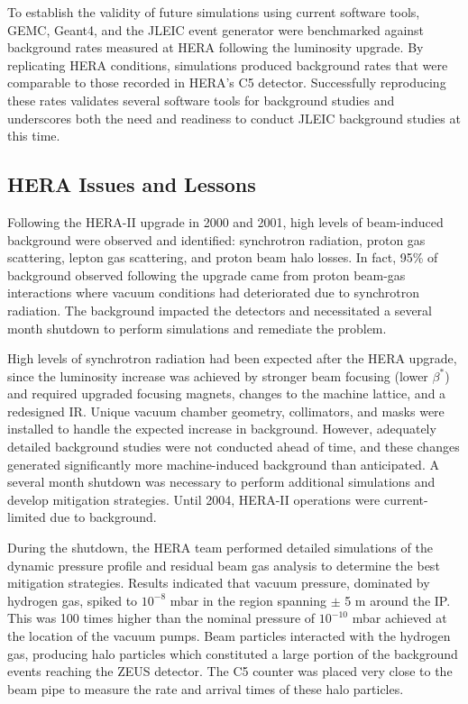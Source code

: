 To establish the validity of future simulations using current software tools, GEMC, Geant4, and the JLEIC event generator were benchmarked against background rates measured at HERA following the luminosity upgrade.  By replicating HERA conditions, simulations produced background rates that were comparable to those recorded in HERA's C5 detector.  Successfully reproducing these rates validates several software tools for background studies and underscores both the need and readiness to conduct JLEIC background studies at this time.

\subsection{HERA Issues and Lessons}
Following the HERA-II upgrade in 2000 and 2001, high levels of beam-induced background were observed and identified: synchrotron radiation, proton gas scattering, lepton gas scattering, and proton beam halo losses.   In fact, 95\% of background observed following the upgrade came from proton beam-gas interactions where vacuum conditions had deteriorated due to synchrotron radiation.  The background impacted the detectors and necessitated a several month shutdown to perform simulations and remediate the problem.

High levels of synchrotron radiation had been expected after the HERA upgrade, since the luminosity increase was achieved by stronger beam focusing (lower $\beta^*$) and required upgraded focusing magnets, changes to the machine lattice, and a redesigned IR. Unique vacuum chamber geometry, collimators, and masks were installed to handle the expected increase in background.  However, adequately detailed background studies were not conducted ahead of time, and these changes generated significantly more machine-induced background than anticipated.  A several month shutdown was necessary to perform additional simulations and develop mitigation strategies.  Until 2004, HERA-II operations were current-limited due to background.

During the shutdown, the HERA team performed detailed simulations of the dynamic pressure profile and residual beam gas analysis to determine the best mitigation strategies.  Results indicated that vacuum pressure, dominated by hydrogen gas, spiked to $10^{-8}$ mbar in the region spanning $\pm$ 5 m around the IP.   This  was 100 times higher than the nominal pressure of $10^{-10}$ mbar achieved at the location of the vacuum pumps.  Beam particles interacted with the hydrogen gas, producing halo particles which constituted a large portion of the background events reaching the ZEUS detector.  The C5 counter was placed very close to the beam pipe to measure the rate and arrival times of these halo particles.

